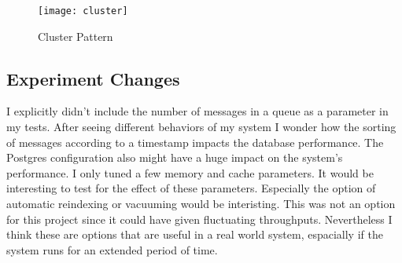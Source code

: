 \documentclass[
10pt, %
a4paper, %
oneside, %
headinclude,footinclude, %
BCOR5mm, %
]{scrartcl}
\begin{document}
\begin{figure}[H]
\centering
\texttt{[image: cluster]}
\caption{Cluster Pattern}
\label{fig:cluster}
\end{figure}


\subsection{Experiment Changes}
I explicitly didn't include the number of messages in a queue as a parameter in my tests. After seeing different behaviors of my system I wonder how the sorting of messages according to a timestamp impacts the database performance.  
The Postgres configuration also might have a huge impact on the system's performance. I only tuned a few memory and cache parameters. It would be interesting to test for the effect of these parameters. Especially the option of automatic reindexing or vacuuming would be interisting. This was not an option for this project since it could have given fluctuating throughputs. Nevertheless I think these are options that are useful in a real world system, espacially if the system runs for an extended period of time.
\end{document}
